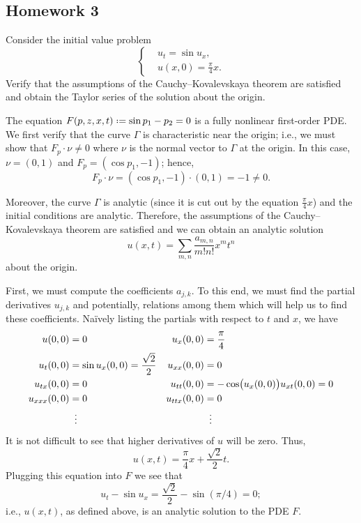 \subsection{Homework 3}
\begin{problem}
  Consider the initial value problem
  \[
    \left\{
      \begin{aligned}
        &u_t=\sin u_x,\\
        &u(x,0)=\tfrac{\pi}{4}x.
      \end{aligned}
    \right.
  \]
  Verify that the assumptions of the Cauchy--Kovalevskaya theorem are
  satisfied and obtain the Taylor series of the solution about the origin.
\end{problem}
\begin{solution*}
  The equation \(F(p,z,x,t)\defeq\sin p_1-p_2=0\) is a fully nonlinear
  first-order PDE. We first verify that the curve \(\Gamma\) is
  characteristic near the origin; i.e., we must show that \(F_p\cdot\nu\neq
  0\) where \(\nu\) is the normal vector to \(\Gamma\) at the origin. In
  this case, \(\nu=(0,1)\) and \(F_p=(\cos p_1,-1)\); hence,
  \[
    F_p\cdot\nu= (\cos p_1,-1)\cdot(0,1)=-1\neq 0.
  \]

  Moreover, the curve \(\Gamma\) is analytic (since it is cut out by the
  equation \(\frac{\pi}{4}x\)) and the initial conditions are
  analytic. Therefore, the assumptions of the Cauchy--Kovalevskaya theorem
  are satisfied and we can obtain an analytic solution
  \[
    u(x,t)=\sum_{m,n}\frac{a_{m,n}}{m!n!}x^mt^n
  \]
  about the origin.

  First, we must compute the coefficients \(a_{j,k}\). To this end, we must
  find the partial derivatives \(u_{j,k}\) and potentially, relations among
  them which will help us to find these coefficients. Naïvely listing the
  partials with respect to \(t\) and \(x\), we have
  \begin{align*}
    u(0,0)&=0&
    u_x(0,0)&=\frac{\pi}{4}\\
    u_t(0,0)&=\sin u_x(0,0)=\frac{\sqrt{2}}{2}&
    u_{xx}(0,0)&=0\\
    u_{tx}(0,0)&=0&
    u_{tt}(0,0)&=-\cos\bigl(u_x(0,0)\bigr)u_{xt}(0,0)=0\\
    u_{xxx}(0,0)&=0&
    u_{ttx}(0,0)&=0\\
    &\vdotswithin{=}&&\vdotswithin{=}
  \end{align*}
  It is not difficult to see that higher derivatives of \(u\) will be
  zero. Thus,
  \[
    u(x,t)=\frac{\pi}{4}x+\frac{\sqrt{2}}{2}t.
  \]
  Plugging this equation into \(F\) we see that
  \[
    u_t-\sin u_x=\frac{\sqrt{2}}{2}-\sin(\pi/4)=0;
  \]
  i.e., \(u(x,t)\), as defined above, is an analytic solution to the PDE
  \(F\).
\end{solution*}

